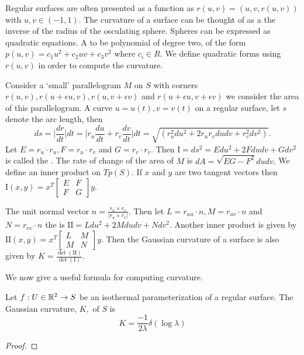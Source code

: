 Regular surfaces are often presented as a function as $r(u,v)=(u,v,r(u,v))$
with $u,v\in(-1,1)$.
The curvature of a surface can be thought of as a the inverse of
the radius of the osculating sphere. Spheres can be expressed
as quadratic equations.  A
  to be polynomial of degree two, of the form $p(u,v)=c_1u^2+c_2uv+c_3v^2$ 
where $c_i\in R$.
We define quadratic forms using $r(u,v)$ in order to compute the curvature.


Consider a `small' parallelogram $M$ on $S$ with corners $r(u,v),r(u+\epsilon u, v), r(u,v+\epsilon v)$ 
and $r(u+\epsilon u, v+\epsilon v)$ we consider the area of this parallelogram.
A curve $u=u(t), v=v(t)$ on a regular surface, let
$s$ denote the arc length, then 
$$ds=\bigg | \frac{dr}{dt}\bigg | dt = \bigg | r_u\frac{du}{dt}+r_v\frac{dv}{dt}\bigg |dt
=\sqrt{(r_u^2 du^2+2r_ur_v du dv + r_v^2dv^2)}.$$
Let $E=r_u\cdot r_u, F=r_u\cdot r_v$ and  $G=r_v\cdot r_v$.
Then $\mathrm{I}=ds^2=Edu^2+2Fdudv +Gdv^2$ is called the .
The rate of change of the area of $M$ is 
$dA=\sqrt{EG-F^2}dudv.$
We define an inner product on $Tp(S)$.
If $x$ and $y$ are two tangent vectors
then $\mathrm{I}(x,y)=x^T\begin{bmatrix}
E & F \\
F & G 
\end{bmatrix}y.$







The unit normal vector $n=\frac{r_u\times r_v}{|r_u\times r_v|}$.
Then let $L=r_{uu}\cdot n, M=r_{uv}\cdot n$ and $N=r_{vv}\cdot n$ the
 is $\mathrm{I\!I}=Ldu^2+2Mdudv+Ndv^2$.
Another inner product is given by $\mathrm{I\!I}(x,y)=x^T\begin{bmatrix}
L & M \\
M & N 
\end{bmatrix}y.$
Then the Gaussian curvature of a surface is also given by
$K=\frac{\det(\mathrm{I\!I})}{\det(\mathrm{I})}.$


We now give a useful formula for computing curvature.

\begin{theorem}\label{thm:log-curve}
	Let $f:U\in\mathbb{R}^2\to S$ be an isothermal parameterization of a regular surface.
	The Gaussian curvature, $K,$ of $S$ is 
		\begin{equation}\label{eqn:log-curve}
			K=\frac{-1}{2\lambda}\delta(\log \lambda)
		\end{equation}
\end{theorem}
\begin{proof}
\end{proof}

